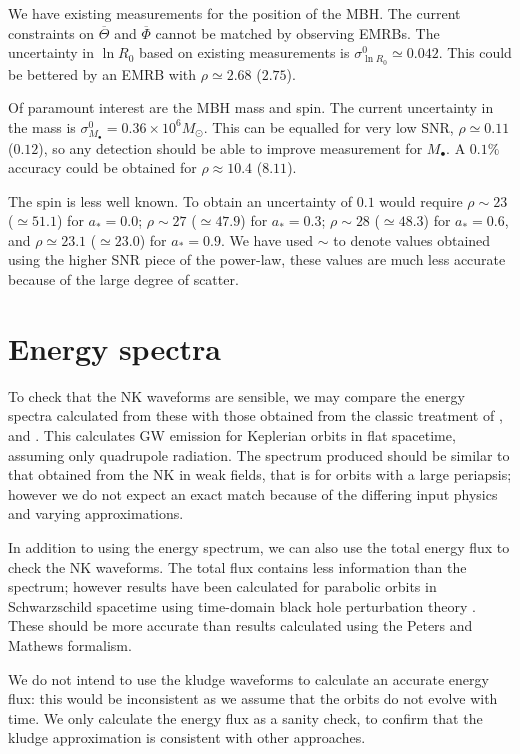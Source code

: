 \documentclass[useAMS,usedcolumn,usegraphicx,usenatbib]{mn2e}
\begin{document}
We have existing measurements for the position of the MBH. The current constraints on $\overline{\Theta}$ and $\overline{\Phi}$ cannot be matched by observing EMRBs. The uncertainty in $\ln R_0$ based on existing measurements is $\sigma_{\ln R_0}^0\simeq 0.042$. This could be bettered by an EMRB with $\rho \simeq 2.68$ ($2.75$).

Of paramount interest are the MBH mass and spin. The current uncertainty in the mass is $\sigma_{M_\bullet}^0 = 0.36 \times 10^6 M_\odot$. This can be equalled for very low SNR, $\rho \simeq 0.11$ ($0.12$), so any detection should be able to improve measurement for $M_\bullet$. A $0.1\%$ accuracy could be obtained for $\rho \approx 10.4$ ($8.11$).

The spin is less well known. To obtain an uncertainty of $0.1$ would require $\rho \sim 23$ ($\simeq 51.1$) for $a_\ast = 0.0$; $\rho \sim 27$ ($\simeq 47.9$) for $a_\ast = 0.3$; $\rho \sim 28$ ($\simeq 48.3$) for $a_\ast = 0.6$, and $\rho \simeq 23.1$ ($\simeq 23.0$) for $a_\ast = 0.9$. We have used $\sim$ to denote values obtained using the higher SNR piece of the power-law, these values are much less accurate because of the large degree of scatter.

\section{Energy spectra}\label{sec:Energy}

To check that the NK waveforms are sensible, we may compare the energy spectra calculated from these with those obtained from the classic treatment of \citet{Peters1963}, and \citet{Peters1964}. This calculates GW emission for Keplerian orbits in flat spacetime, assuming only quadrupole radiation. The spectrum produced should be similar to that obtained from the NK in weak fields, that is for orbits with a large periapsis; however we do not expect an exact match because of the differing input physics and varying approximations.

In addition to using the energy spectrum, we can also use the total energy flux to check the NK waveforms. The total flux contains less information than the spectrum; however results have been calculated for parabolic orbits in Schwarzschild spacetime using time-domain black hole perturbation theory \citep{Martel2004}. These should be more accurate than results calculated using the Peters and Mathews formalism.

We do not intend to use the kludge waveforms to calculate an accurate energy flux: this would be inconsistent as we assume that the orbits do not evolve with time. We only calculate the energy flux as a sanity check, to confirm that the kludge approximation is consistent with other approaches.
\end{document}
